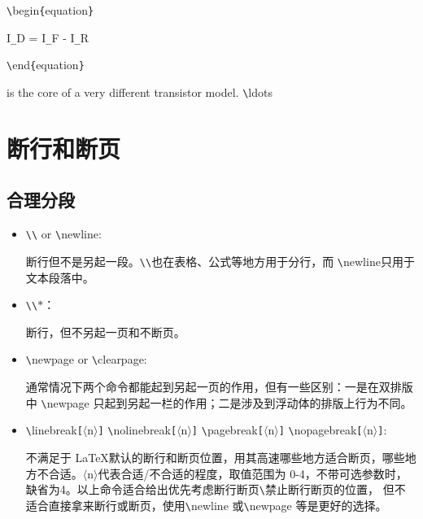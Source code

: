 \documentclass[UTF8]{ctexart}
\begin{document}
\texttt{\textbackslash}begin\texttt{\{}equation\texttt{\}}

   \qquad I\texttt{\_}D = I\texttt{\_}F - I\texttt{\_}R

\texttt{\textbackslash}end\texttt{\{}equation\texttt{\}}

is the core of a very different transistor model. \texttt{\textbackslash}ldots
\section{断行和断页}
\subsection{合理分段}
\begin{itemize}
  \item \texttt{\textbackslash}\texttt{\textbackslash} or \texttt{\textbackslash}newline:

  断行但不是另起一段。\texttt{\textbackslash}\texttt{\textbackslash}也在表格、公式等地方用于分行，而
\texttt{\textbackslash}newline只用于文本段落中。
  \item \texttt{\textbackslash}\texttt{\textbackslash}\texttt{$\ast$}：

  断行，但不另起一页和不断页。
  \item \texttt{\textbackslash}newpage or \texttt{\textbackslash}clearpage:

  通常情况下两个命令都能起到另起一页的作用，但有一些区别：一是在双排版中 \texttt{\textbackslash}newpage 只起到另起一栏的作用；二是涉及到浮动体的排版上行为不同。

  \item \texttt{\textbackslash}linebreak\texttt{[}$\langle$n$\rangle$\texttt{]} \texttt{\textbackslash}nolinebreak\texttt{[}$\langle$n$\rangle$\texttt{]} \texttt{\textbackslash}pagebreak\texttt{[}$\langle$n$\rangle$\texttt{]}
  \texttt{\textbackslash}nopagebreak\texttt{[}$\langle$n$\rangle$\texttt{]}:

  不满足于 \LaTeX 默认的断行和断页位置，用其高速哪些地方适合断页，哪些地方不合适。$\langle$n$\rangle$代表合适/不合适的程度，取值范围为 0-4，不带可选参数时，缺省为4。以上命令适合给出优先考虑断行断页\texttt{\textbackslash}禁止断行断页的位置，
  但不适合直接拿来断行或断页，使用\texttt{\textbackslash}newline 或\texttt{\textbackslash}newpage 等是更好的选择。
\end{itemize}
\end{document}
